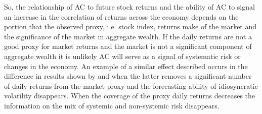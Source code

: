 So, the relationship of AC to future stock returns and the ability of AC to signal an increase in the correlation of returns across the economy depends on the portion that the observed proxy, i.e. stock index, returns make of the market and the significance of the market in aggregate wealth. If the daily returns are not a good proxy for market returns and the market is not a significant component of aggregate wealth it is unlikely AC will serve as a signal of systematic risk or changes in the economy. An example of a similar effect described occurs in the difference in results shown by \citet{goyal_idiosyncratic_2003} and \citet{bali_does_nodate} when the latter removes a significant number of daily returns from the market proxy and the forecasting ability of idiosyncratic volatility disappears. When the coverage of the proxy daily returns decreases the information on the mix of systemic and non-systemic risk disappears.


